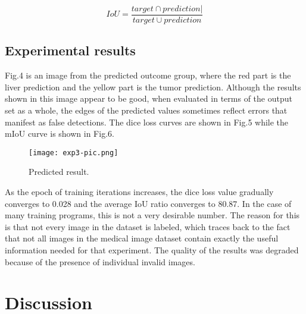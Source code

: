 \documentclass[a4paper]{article}
\begin{document}
\begin{equation}
	IoU = \frac{target \cap prediction|}{target \cup prediction}
	\label{eqn: eq1}
\end{equation}

\subsection{Experimental results}

Fig.4 is an image from the predicted outcome group, where the red part is the liver prediction and the yellow part is the tumor prediction. Although the results shown in this image appear to be good, when evaluated in terms of the output set as a whole, the edges of the predicted values sometimes reflect errors that manifest as false detections. The dice loss curves are shown in Fig.5 while the mIoU curve is shown in Fig.6.

\begin{figure}
	\centering
	\texttt{[image: exp3-pic.png]}
	\vspace*{-4mm}
	\caption{Predicted result.}
	\label{fig: fig1}
\end{figure}

As the epoch of training iterations increases, the dice loss value gradually converges to 0.028 and the average IoU ratio converges to 80.87. In the case of many training programs, this is not a very desirable number.  The reason for this is that not every image in the dataset is labeled, which traces back to the fact that not all images in the medical image dataset contain exactly the useful information needed for that experiment. The quality of the results was degraded because of the presence of individual invalid images.


\section{Discussion}
\end{document}
